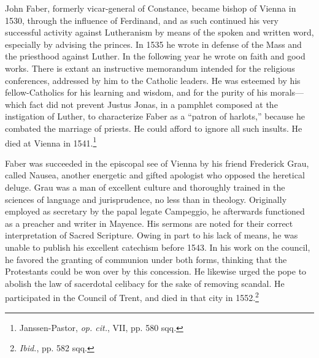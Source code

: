 John Faber, formerly vicar-general of Constance, became bishop
of Vienna in 1530, through the influence of Ferdinand, and as such
continued his very successful activity against Lutheranism by means
of the spoken and written word, especially by advising the princes.
In 1535 he wrote in defense of the Mass and the priesthood against
Luther. In the following year he wrote on faith and good works.
There is extant an instructive memorandum intended for the religious
conferences, addressed by him to the Catholic leaders. He was esteemed
by his fellow-Catholics for his learning and wisdom, and for
the purity of his morals—which fact did not prevent Justus Jonas,
in a pamphlet composed at the instigation of Luther, to characterize
Faber as a “patron of harlots,” because he combated the marriage
of priests. He could afford to ignore all such insults. He died at Vienna
in 1541.\footnote{Janssen-Pastor, \textit{op. cit.}, VII, pp. 580 sqq.}

Faber was succeeded in the episcopal see of Vienna by his friend
Frederick Grau, called Nausea, another energetic and gifted apologist
who opposed the heretical deluge. Grau was a man of excellent
culture and thoroughly trained in the sciences of language and jurisprudence,
no less than in theology. Originally employed as secretary
by the papal legate Campeggio, he afterwards functioned as a preacher
and writer in Mayence. His sermons are noted for their correct interpretation
of Sacred Scripture. Owing in part to his lack of means, he
was unable to publish his excellent catechism before 1543. In his work
on the council, he favored the granting of communion under both
forms, thinking that the Protestants could be won over by this concession.
He likewise urged the pope to abolish the law of sacerdotal
celibacy for the sake of removing scandal. He participated in the
Council of Trent, and died in that city in 1552.\footnote{\textit{Ibid.}, pp. 582 sqq.}

